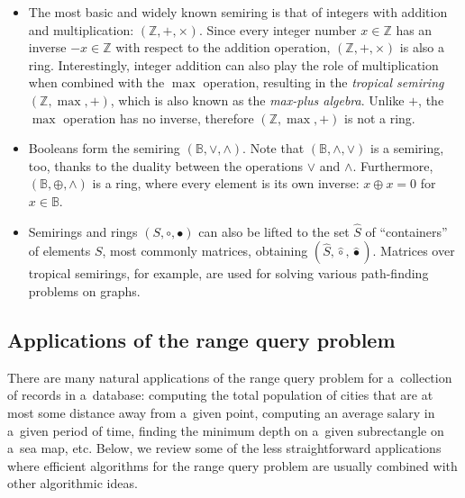 \documentclass{toc}
\begin{document}
\begin{itemize}
    \item The most basic and widely known semiring is that of integers with
    addition and multiplication: $(\mathbb{Z}, +, \times)$. Since every integer
    number $x\in \mathbb{Z}$ has an inverse $-x \in \mathbb{Z}$ with respect to
    the addition operation, $(\mathbb{Z}, +, \times)$ is also a ring.
    Interestingly, integer addition can also play the role of multiplication when
    combined with the $\max$ operation, resulting in the \emph{tropical semiring}
    $(\mathbb{Z}, \max, +)$, which is also known as the \emph{max-plus algebra}.
    Unlike $+$, the $\max$ operation has no inverse, therefore
    $(\mathbb{Z}, \max, +)$ is not a ring.

    \item Booleans form the semiring $(\mathbb{B}, \vee, \wedge)$. Note that
$(\mathbb{B}, \wedge, \vee)$ is a semiring, too, %
    thanks to the duality between
    the operations $\vee$ and $\wedge$. Furthermore,
    $(\mathbb{B}, \oplus, \wedge)$ is a ring, where every element is its own
    inverse: $x \oplus x = 0$ for $x \in \mathbb{B}$.

    \item Semirings and rings $(S, \circ, \bullet)$ can also be lifted to the set
    $\hat{S}$ of ``containers'' of elements $S$, most commonly matrices, obtaining
    $(\hat{S}, \hat{\circ}, \hat{\bullet})$. Matrices over tropical semirings, for
    example, are used for solving various path-finding problems on graphs.
\end{itemize}

\subsection{Applications of the range query problem}\label{subseq:rmqapp}
There are many natural applications of the 
range query
problem for a~collection of records in a~database: computing the total population of cities that are at most some distance away from a~given point, computing an average salary in a~given period of time, finding the minimum depth on a~given subrectangle on a~sea map, etc. Below, we review some of the less straightforward applications where efficient algorithms for the 
range query
problem are usually combined with other algorithmic ideas.
\end{document}
